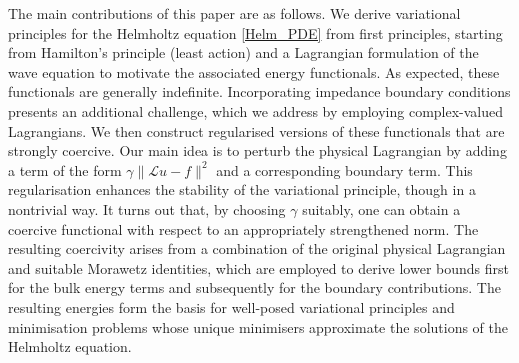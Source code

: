 \documentclass[twoside,11pt]{article}
\def\L{{\mathscr{L}}}
\def\L{{\mathscr{L}}}
\begin{document}
 {The main contributions of this paper are as follows. We derive variational principles for the Helmholtz equation \eqref{Helm_PDE} from first principles, starting from Hamilton's principle (least action) and a Lagrangian formulation of the wave equation to motivate the associated energy functionals. As expected, these functionals are generally indefinite. Incorporating impedance boundary conditions presents an additional challenge, which we address by employing complex-valued Lagrangians. We then construct regularised versions of these functionals that are strongly coercive.} %
Our main idea is to perturb the physical Lagrangian by adding a term of the form 
$\gamma \| \L u-f \|^2$ and a corresponding boundary term. This regularisation enhances the stability of the variational principle, though in a nontrivial way. It turns out that, by {choosing $\gamma$ suitably}, one can obtain a coercive functional with respect to an appropriately strengthened norm. The resulting coercivity arises from a combination of the original physical Lagrangian and suitable Morawetz identities, which are employed to derive lower bounds first for the bulk energy terms and subsequently for the boundary contributions.
 {The resulting energies form the basis for well-posed variational principles and minimisation problems whose unique minimisers approximate the solutions of the Helmholtz equation.} 
  
\end{document}
